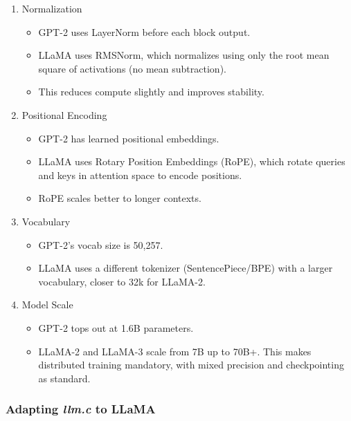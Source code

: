 \documentclass[
  letterpaper,
  DIV=11,
  numbers=noendperiod]{scrreprt}
\providecommand{\tightlist}{%
  \setlength{\itemsep}{0pt}\setlength{\parskip}{0pt}}
\begin{document}
\begin{enumerate}
\def\labelenumi{\arabic{enumi}.}
\item
  Normalization

  \begin{itemize}
  \tightlist
  \item
    GPT-2 uses LayerNorm before each block output.
  \item
    LLaMA uses RMSNorm, which normalizes using only the root mean square
    of activations (no mean subtraction).
  \item
    This reduces compute slightly and improves stability.
  \end{itemize}
\item
  Positional Encoding

  \begin{itemize}
  \tightlist
  \item
    GPT-2 has learned positional embeddings.
  \item
    LLaMA uses Rotary Position Embeddings (RoPE), which rotate queries
    and keys in attention space to encode positions.
  \item
    RoPE scales better to longer contexts.
  \end{itemize}
\item
  Vocabulary

  \begin{itemize}
  \tightlist
  \item
    GPT-2's vocab size is 50,257.
  \item
    LLaMA uses a different tokenizer (SentencePiece/BPE) with a larger
    vocabulary, closer to 32k for LLaMA-2.
  \end{itemize}
\item
  Model Scale

  \begin{itemize}
  \tightlist
  \item
    GPT-2 tops out at 1.6B parameters.
  \item
    LLaMA-2 and LLaMA-3 scale from 7B up to 70B+. This makes distributed
    training mandatory, with mixed precision and checkpointing as
    standard.
  \end{itemize}
\end{enumerate}

\subsubsection{\texorpdfstring{Adapting \emph{llm.c} to
LLaMA}{Adapting llm.c to LLaMA}}\label{adapting-llm.c-to-llama}
\end{document}
